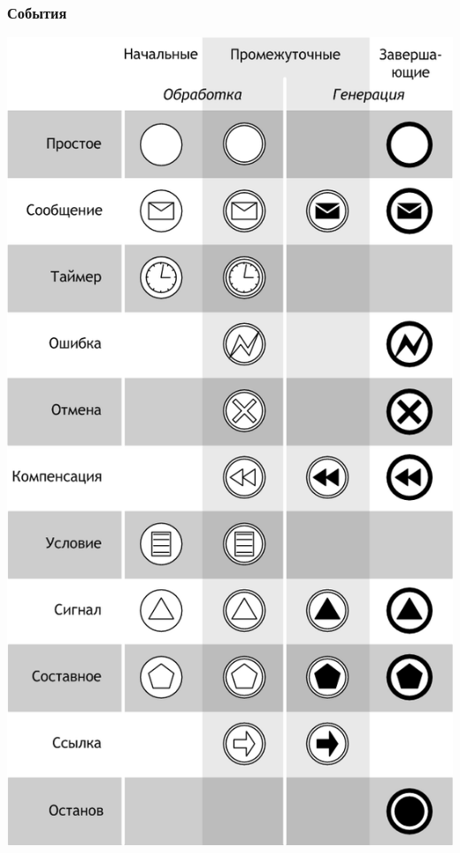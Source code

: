 \documentclass{../cscslides}
\begin{document}
    \begin{frame}
        \frametitle{События}
        \begin{center}
            \includegraphics[height=0.8\textheight]{bpmnEvents.png}
        \end{center}
    \end{frame}
\end{document}
